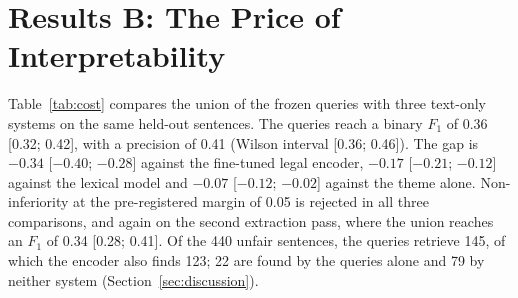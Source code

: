 \section{Results B: The Price of Interpretability}
\label{sec:cost}
Table~\ref{tab:cost} compares the union of the frozen queries with three text-only systems on the same held-out sentences. The queries reach a binary $F_1$ of 0.36 [0.32; 0.42], with a precision of 0.41 (Wilson interval [0.36; 0.46]). The gap is $-0.34$ [$-0.40$; $-0.28$] against the fine-tuned legal encoder, $-0.17$ [$-0.21$; $-0.12$] against the lexical model and $-0.07$ [$-0.12$; $-0.02$] against the theme alone. Non-inferiority at the pre-registered margin of 0.05 is rejected in all three comparisons, and again on the second extraction pass, where the union reaches an $F_1$ of 0.34 [0.28; 0.41]. Of the 440 unfair sentences, the queries retrieve 145, of which the encoder also finds 123; 22 are found by the queries alone and 79 by neither system (Section~\ref{sec:discussion}).


